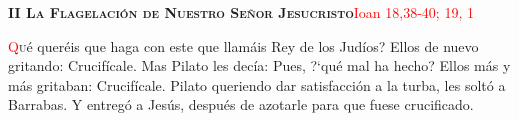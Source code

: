 \noindent\textbf{\textsc{II La Flagelación de Nuestro Señor Jesucristo}}\hfill\textcolor{red}{Ioan 18,38-40; 19, 1}

\vspace{0.25em}

\lettrine[lines=2, ante={?`}]{\textcolor{red}{Q}}ué queréis que haga con este que llamáis Rey de los Judíos? Ellos de nuevo gritando: Crucifícale. Mas Pilato les decía: Pues, {?`}qué
mal ha hecho? Ellos más y más gritaban: Crucifícale. Pilato queriendo dar satisfacción a la turba, les soltó a Barrabas. Y entregó a Jesús, después de azotarle para que fuese crucificado.